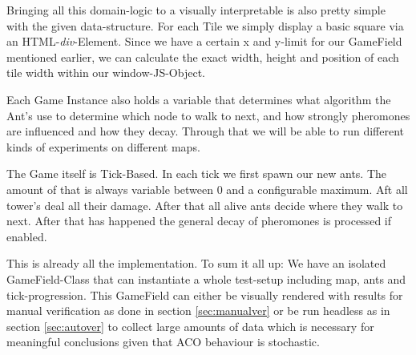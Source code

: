 Bringing all this domain-logic to a visually interpretable is also pretty simple with the given data-structure. For each Tile we simply display a basic square via an HTML-\textit{div}-Element. Since we have a certain x and y-limit for our GameField mentioned earlier, we can calculate the exact width, height and position of each tile width within our window-JS-Object\cite[P. 570]{goodman2002dynamic}.

Each Game Instance also holds a variable that determines what algorithm the Ant's use to determine which node to walk to next, and how strongly pheromones are influenced and how they decay. Through that we will be able to run different kinds of experiments on different maps.

The Game itself is Tick-Based. In each tick we first spawn our new ants. The amount of that is always variable between 0 and a configurable maximum. Aft all tower's deal all their damage. After that all alive ants decide where they walk to next. After that has happened the general decay of pheromones is processed if enabled.

This is already all the implementation. To sum it all up: We have an isolated GameField-Class that can instantiate a whole test-setup including map, ants and tick-progression. This GameField can either be visually rendered with results for manual verification as done in section \ref{sec:manualver} or be run headless as in section \ref{sec:autover} to collect large amounts of data which is necessary for meaningful conclusions given that ACO behaviour is stochastic.